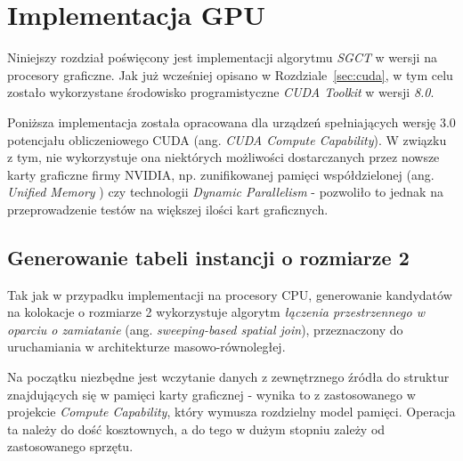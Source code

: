 \documentclass[12pt]{article}
\begin{document}
\newpage

\section{Implementacja GPU}
\label{sec:gpu}

Niniejszy rozdział poświęcony jest implementacji algorytmu \textit{SGCT} w wersji na procesory graficzne. Jak już wcześniej opisano w Rozdziale~\ref{sec:cuda}, w tym celu zostało wykorzystane środowisko programistyczne \textit{CUDA Toolkit} w wersji \textit{8.0}.

Poniższa implementacja została opracowana dla urządzeń spełniających wersję 3.0 potencjału obliczeniowego CUDA (ang.\textit{ CUDA Compute Capability}). W związku z tym, nie wykorzystuje ona niektórych możliwości dostarczanych przez nowsze karty graficzne firmy NVIDIA, np. zunifikowanej pamięci współdzielonej (ang. \textit{Unified Memory} \cite{cuda_um}) czy technologii \textit{Dynamic Parallelism} \cite{cuda_dp} - pozwoliło to jednak na przeprowadzenie testów na większej ilości kart graficznych.



\subsection{Generowanie tabeli instancji o rozmiarze 2}

Tak jak w przypadku implementacji na procesory CPU, generowanie kandydatów na kolokacje o rozmiarze 2 wykorzystuje algorytm \textit{łączenia przestrzennego w oparciu o zamiatanie} (ang. \textit{sweeping-based spatial join}), przeznaczony do uruchamiania w architekturze masowo-równoległej.

Na początku niezbędne jest wczytanie danych z zewnętrznego źródła do struktur znajdujących się w pamięci karty graficznej - wynika to z zastosowanego w projekcie \textit{Compute Capability}, który wymusza rozdzielny model pamięci. Operacja ta należy do dość kosztownych, a do tego w dużym stopniu zależy od zastosowanego sprzętu.
\end{document}
